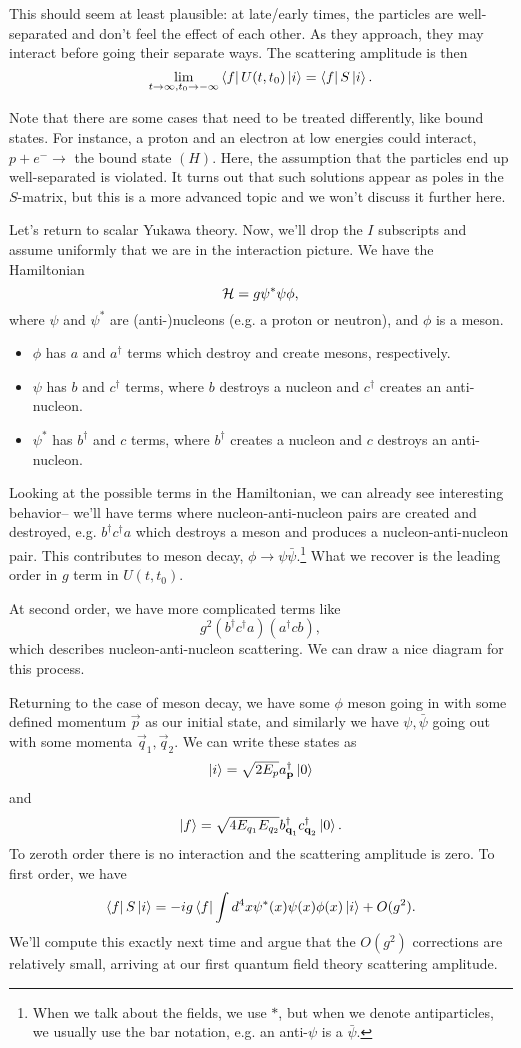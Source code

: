 This should seem at least plausible: at late/early times, the particles are well-separated and don't feel the effect of each other. As they approach, they may interact before going their separate ways. The scattering amplitude is then
$$\lim_{t\to\infty, t_0\to -\infty}\left< f \right|U(t,t_0)\left| i \right>=\left< f \right|S \left| i \right>.$$

Note that there are some cases that need to be treated differently, like bound states. For instance, a proton and an electron at low energies could interact, $p+e^-\to$ the bound state $(H)$. Here, the assumption that the particles end up well-separated is violated. It turns out that such solutions appear as poles in the $S$-matrix, but this is a more advanced topic and we won't discuss it further here.

Let's return to scalar Yukawa theory. Now, we'll drop the $I$ subscripts and assume uniformly that we are in the interaction picture. We have the Hamiltonian
$$\mathcal H = g \psi^* \psi \phi,$$
where $\psi$ and $\psi^*$ are (anti-)nucleons (e.g. a proton or neutron), and $\phi$ is a meson.
\begin{itemize}
    \item $\phi$ has $a$ and $a^\dagger$ terms which destroy and create mesons, respectively.
    \item $\psi$ has $b$ and $c^\dagger$ terms, where $b$ destroys a nucleon and $c^\dagger$ creates an anti-nucleon.
    \item $\psi^*$ has $b^\dagger$ and $c$ terms, where $b^\dagger$ creates a nucleon and $c$ destroys an anti-nucleon.
\end{itemize}
Looking at the possible terms in the Hamiltonian, we can already see interesting behavior-- we'll have terms where nucleon-anti-nucleon pairs are created and destroyed, e.g. $b^\dagger c^\dagger a$ which destroys a meson and produces a nucleon-anti-nucleon pair. This contributes to meson decay, $\phi\to \psi\bar \psi$.\footnote{When we talk about the fields, we use $*$, but when we denote antiparticles, we usually use the bar notation, e.g. an anti-$\psi$ is a $\bar \psi$.} What we recover is the leading order in $g$ term in $U(t,t_0)$.

At second order, we have more complicated terms like
$$g^2(b^\dagger c^\dagger a)(a^\dagger c b),$$
which describes nucleon-anti-nucleon scattering. We can draw a nice diagram for this process.

Returning to the case of meson decay, we have some $\phi$ meson going in with some defined momentum $\vec p$ as our initial state, and similarly we have $\psi,\bar \psi$ going out with some momenta $\vec q_1,\vec q_2.$ We can write these states as
$$\left| i \right>=\sqrt{2E_p}a_{\boldsymbol{\mathbf{p}}}^\dagger \left| 0 \right>$$
and
$$\left| f \right>=\sqrt{4E_{q_1}E_{q_2}}b_{\boldsymbol{\mathbf{q}}_1}^\dagger c_{\boldsymbol{\mathbf{q}}_2}^\dagger \left| 0 \right>.$$
To zeroth order there is no interaction and the scattering amplitude is zero. To first order, we have
$$\left< f \right|S\left| i \right>=-ig \left< f \right|\int d^4 x \psi^* (x) \psi(x) \phi(x) \left| i \right> + O(g^2).$$
We'll compute this exactly next time and argue that the $O(g^2)$ corrections are relatively small, arriving at our first quantum field theory scattering amplitude.